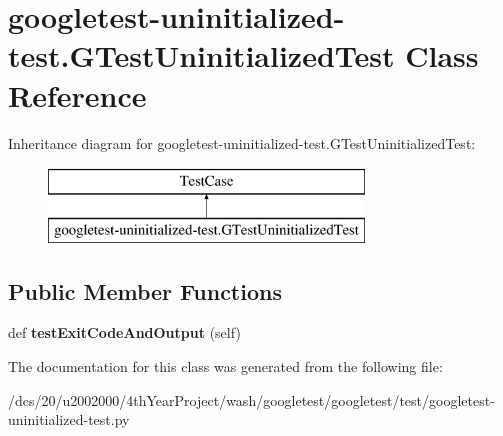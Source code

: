 \hypertarget{classgoogletest-uninitialized-test_1_1GTestUninitializedTest}{}\section{googletest-\/uninitialized-\/test.G\+Test\+Uninitialized\+Test Class Reference}
\label{classgoogletest-uninitialized-test_1_1GTestUninitializedTest}
Inheritance diagram for googletest-\/uninitialized-\/test.G\+Test\+Uninitialized\+Test\+:\begin{figure}[H]
\begin{center}
\leavevmode
\includegraphics[height=2.000000cm]{classgoogletest-uninitialized-test_1_1GTestUninitializedTest}
\end{center}
\end{figure}
\subsection*{Public Member Functions}
\begin{DoxyCompactItemize}
\item 
\mbox{\label{classgoogletest-uninitialized-test_1_1GTestUninitializedTest_aa3c5445f3d94a94d9b252fd64f05e4a0}} 
def {\bfseries test\+Exit\+Code\+And\+Output} (self)
\end{DoxyCompactItemize}


The documentation for this class was generated from the following file\+:\begin{DoxyCompactItemize}
\item 
/dcs/20/u2002000/4th\+Year\+Project/wash/googletest/googletest/test/googletest-\/uninitialized-\/test.\+py\end{DoxyCompactItemize}
